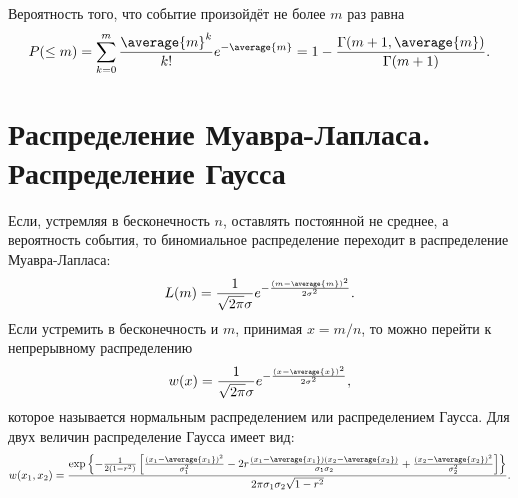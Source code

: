     Вероятность того, что событие произойдёт не более \( m \) раз равна
    \[
        P(\le m) = \sum_{k=0}^m \frac{\average{m}^k}{k!}e^{-\average{m}} =
        1 - \frac{\Gamma(m+1, \average{m})}{\Gamma(m+1)}.
    \]

\section{Распределение Муавра-Лапласа. Распределение Гаусса}
    Если, устремляя в бесконечность \( n \), оставлять постоянной не среднее, а
    вероятность события, то биномиальное распределение переходит в распределение
    Муавра-Лапласа:
    \[
        L(m) = \frac{1}{\sqrt{2\pi}\sigma}
            e^{-\frac{\left(m-\average{m}\right)^2}{2\sigma^2}}.
    \]
    Если устремить в бесконечность и \( m \), принимая \( x = m / n \), то можно
    перейти к непрерывному распределению
    \[
        w(x) = \frac{1}{\sqrt{2\pi}\sigma}
            e^{-\frac{\left(x-\average{x}\right)^2}{2\sigma^2}},
    \]
    которое называется нормальным распределением или распределением Гаусса.
    Для двух величин распределение Гаусса имеет вид:
    \[
        w(x_1, x_2) = \frac{
            \exp\left\{-\frac{1}{2(1-r^2)}\left[
                \frac{(x_1 - \average{x_1})^2}{\sigma_1^2} -
                2r\frac{(x_1 - \average{x_1})(x_2 - \average{x_2})}
                    {\sigma_1\sigma_2} +
                \frac{(x_2 - \average{x_2})^2}{\sigma_2^2}
            \right]\right\}
            }{2\pi\sigma_1\sigma_2\sqrt{1 - r^2}}.
    \]

